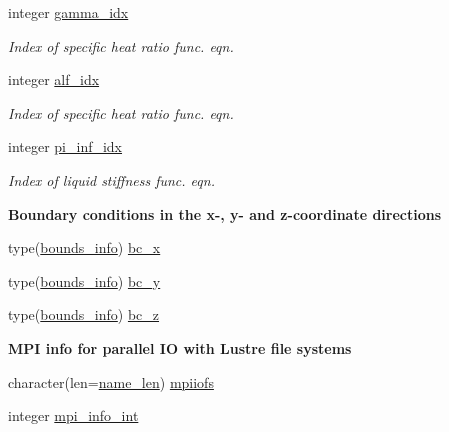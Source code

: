 \begin{Indent}
\begin{DoxyCompactItemize}
integer \hyperlink{namespacem__global__parameters_a4ecdedaf3db880f8d71dbefc816322f8}{gamma\+\_\+idx}
\begin{DoxyCompactList}\small\item\em Index of specific heat ratio func. eqn. \end{DoxyCompactList}\item 
integer \hyperlink{namespacem__global__parameters_af451fa7762c859ef20552498fa6edb16}{alf\+\_\+idx}
\begin{DoxyCompactList}\small\item\em Index of specific heat ratio func. eqn. \end{DoxyCompactList}\item 
integer \hyperlink{namespacem__global__parameters_a7db1a23566279bdbc7da68850c596c69}{pi\+\_\+inf\+\_\+idx}
\begin{DoxyCompactList}\small\item\em Index of liquid stiffness func. eqn. \end{DoxyCompactList}\end{DoxyCompactItemize}
\end{Indent}
\begin{Indent}\textbf{ Boundary conditions in the x-\/, y-\/ and z-\/coordinate directions}\par
\begin{DoxyCompactItemize}
\item 
type(\hyperlink{structm__derived__types_1_1bounds__info}{bounds\+\_\+info}) \hyperlink{namespacem__global__parameters_aa46a7f3638e49fa9ec33ea859b9e6a5a}{bc\+\_\+x}
\item 
type(\hyperlink{structm__derived__types_1_1bounds__info}{bounds\+\_\+info}) \hyperlink{namespacem__global__parameters_a68eaaca2982b39252417b29ef5d0f9c3}{bc\+\_\+y}
\item 
type(\hyperlink{structm__derived__types_1_1bounds__info}{bounds\+\_\+info}) \hyperlink{namespacem__global__parameters_a6769808569174ff0eef096e958889837}{bc\+\_\+z}
\end{DoxyCompactItemize}
\end{Indent}
\begin{Indent}\textbf{ M\+PI info for parallel IO with Lustre file systems}\par
\begin{DoxyCompactItemize}
\item 
character(len=\hyperlink{namespacem__global__parameters_ac8252b115e717c6f1c8595be6f897df7}{name\+\_\+len}) \hyperlink{namespacem__global__parameters_ad4713c1e89eaa8fac3bb2181ba87b192}{mpiiofs}
\item 
integer \hyperlink{namespacem__global__parameters_a2663d07998d11d25e223cd7ad0bbd748}{mpi\+\_\+info\+\_\+int}
\end{DoxyCompactItemize}
\end{Indent}
